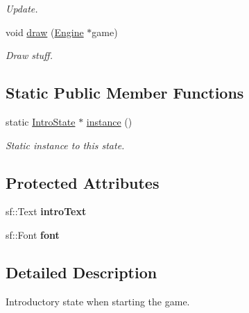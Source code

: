 \begin{DoxyCompactItemize}
\begin{DoxyCompactList}\small\item\em Update. \end{DoxyCompactList}\item 
\hypertarget{class_intro_state_aa728fea94df255defed080ee288b010e}{void \hyperlink{class_intro_state_aa728fea94df255defed080ee288b010e}{draw} (\hyperlink{class_engine}{Engine} $\ast$game)}\label{class_intro_state_aa728fea94df255defed080ee288b010e}

\begin{DoxyCompactList}\small\item\em Draw stuff. \end{DoxyCompactList}\end{DoxyCompactItemize}
\subsection*{Static Public Member Functions}
\begin{DoxyCompactItemize}
\item 
\hypertarget{class_intro_state_a53985effdbab3cb49b25a961557d6f7e}{static \hyperlink{class_intro_state}{Intro\-State} $\ast$ \hyperlink{class_intro_state_a53985effdbab3cb49b25a961557d6f7e}{instance} ()}\label{class_intro_state_a53985effdbab3cb49b25a961557d6f7e}

\begin{DoxyCompactList}\small\item\em Static instance to this state. \end{DoxyCompactList}\end{DoxyCompactItemize}
\subsection*{Protected Attributes}
\begin{DoxyCompactItemize}
\item 
\hypertarget{class_intro_state_aede1bf8dbc159679398843154b43f369}{sf\-::\-Text {\bfseries intro\-Text}}\label{class_intro_state_aede1bf8dbc159679398843154b43f369}

\item 
\hypertarget{class_intro_state_aef1eb238b76c25ff4af1c8237455767e}{sf\-::\-Font {\bfseries font}}\label{class_intro_state_aef1eb238b76c25ff4af1c8237455767e}

\end{DoxyCompactItemize}


\subsection{Detailed Description}
Introductory state when starting the game. 

